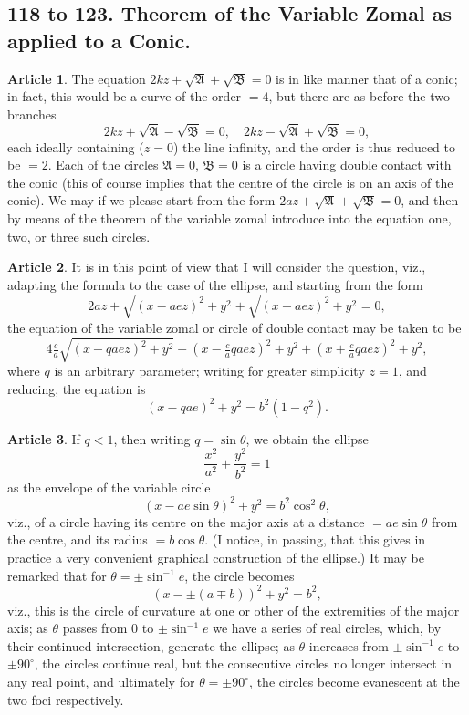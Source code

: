 \documentclass[11pt,a4paper]{article}
\theoremstyle{definition}
\newtheorem{art}{Article}
\begin{document}
\subsection{118 to 123. Theorem of the Variable Zomal as applied to a Conic.}

\begin{art}
The equation $2kz + \sqrt{\mathfrak{A}} + \sqrt{\mathfrak{B}} = 0$ is in like manner that of a conic; in fact, this would be a curve of the order $= 4$, but there are as before the two branches
\[
2kz + \sqrt{\mathfrak{A}} - \sqrt{\mathfrak{B}} = 0, \quad 2kz - \sqrt{\mathfrak{A}} + \sqrt{\mathfrak{B}} = 0,
\]
each ideally containing ($z = 0$) the line infinity, and the order is thus reduced to be $= 2$. Each of the circles $\mathfrak{A} = 0$, $\mathfrak{B} = 0$ is a circle having double contact with the conic (this of course implies that the centre of the circle is on an axis of the conic). We may if we please start from the form $2az + \sqrt{\mathfrak{A}} + \sqrt{\mathfrak{B}} = 0$, and then by means of the theorem of the variable zomal introduce into the equation one, two, or three such circles.
\end{art}

\begin{art}
It is in this point of view that I will consider the question, viz., adapting the formula to the case of the ellipse, and starting from the form
\[
2az + \sqrt{(x - aez)^{2} + y^{2}} + \sqrt{(x + aez)^{2} + y^{2}} = 0,
\]
the equation of the variable zomal or circle of double contact may be taken to be
\[
4\tfrac{c}{a}\sqrt{(x - qaez)^{2} + y^{2}} + (x - \tfrac{c}{a}qaez)^{2} + y^{2} + (x + \tfrac{c}{a}qaez)^{2} + y^{2},
\]
where $q$ is an arbitrary parameter; writing for greater simplicity $z = 1$, and reducing, the equation is
\[
(x - qae)^{2} + y^{2} = b^{2}(1 - q^{2}).
\]
\end{art}

\begin{art}
If $q < 1$, then writing $q = \sin\theta$, we obtain the ellipse
\[
\frac{x^{2}}{a^{2}} + \frac{y^{2}}{b^{2}} = 1
\]
as the envelope of the variable circle
\[
(x - ae\sin\theta)^{2} + y^{2} = b^{2}\cos^{2}\theta,
\]
viz., of a circle having its centre on the major axis at a distance $= ae\sin\theta$ from the centre, and its radius $= b\cos\theta$. (I notice, in passing, that this gives in practice a very convenient graphical construction of the ellipse.) It may be remarked that for $\theta = \pm\sin^{-1}e$, the circle becomes
\[
(x - \pm(a \mp b))^{2} + y^{2} = b^{2},
\]
viz., this is the circle of curvature at one or other of the extremities of the major axis; as $\theta$ passes from $0$ to $\pm\sin^{-1}e$ we have a series of real circles, which, by their continued intersection, generate the ellipse; as $\theta$ increases from $\pm\sin^{-1}e$ to $\pm 90^{\circ}$, the circles continue real, but the consecutive circles no longer intersect in any real point, and ultimately for $\theta = \pm 90^{\circ}$, the circles become evanescent at the two foci respectively.
\end{art}
\end{document}
